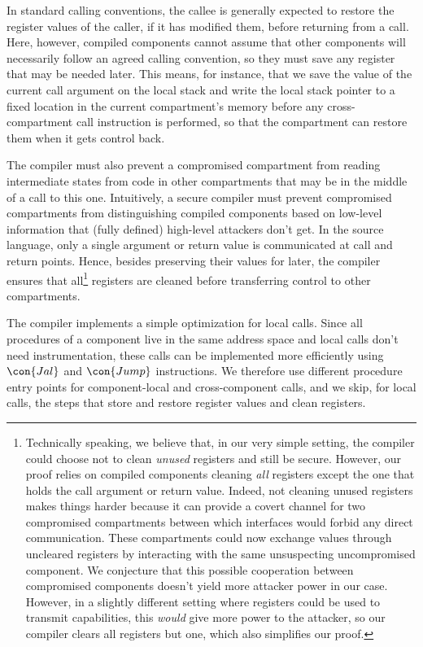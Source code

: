 \documentclass[10pt, conference, compsocconf, letterpaper, times]{IEEEtran}
\begin{document}
In standard calling conventions, the callee is generally expected to restore
the register values of the caller, if it has modified them, before
returning from a call.
Here, however, compiled components cannot assume that other
components will necessarily follow an agreed calling convention, so they
must save any register that may be needed later.
This means, for instance, that we save the value of the current
call argument on the local stack and write the
local stack pointer to a fixed location in the current compartment's
memory before any cross-compartment call instruction is performed,
so that the compartment can restore them when it gets control back.

The compiler must also prevent a compromised compartment from reading
intermediate states from code in other compartments that may be in the
middle of a call to this one.
Intuitively, a secure compiler must prevent compromised compartments from
distinguishing compiled components based on low-level information that
(fully defined) high-level attackers don't get.  In the source language,
only a single argument or return value is communicated at call and return
points.  
Hence, besides preserving their values for later, the compiler
ensures that all\footnote{
  Technically speaking, we believe that, in our very simple setting,
  the compiler could choose not to clean \emph{unused} registers and
  still be secure.
However, our proof relies on compiled components cleaning \emph{all}
  registers except the one that holds the call argument or return
  value.
Indeed, not cleaning unused registers makes things harder because it
  can provide a covert channel for two compromised compartments
  between which interfaces would forbid any direct communication.
These compartments could now exchange values through uncleared
  registers by interacting with the same unsuspecting uncompromised
  component.
We conjecture that this possible cooperation between compromised
  components doesn't yield more attacker power
  in our case.
However, in a
  \iffull
  slightly different
  \fi
  setting
  where registers could be used to transmit capabilities,
  this \emph{would} give more power to the attacker, so
  our compiler clears all registers but one, which also simplifies our
  proof.}
registers are cleaned before transferring control to other
compartments. 


The compiler implements a simple optimization for local calls.
Since all procedures of a component live in the same
address space and local calls don't need instrumentation, these calls
can be implemented more efficiently using $\con{Jal}$ and
$\con{Jump}$ instructions.
We therefore use different procedure entry points for
component-local and cross-component calls, and we skip, for
local calls, the steps that store and restore register values
and clean registers.
\end{document}
